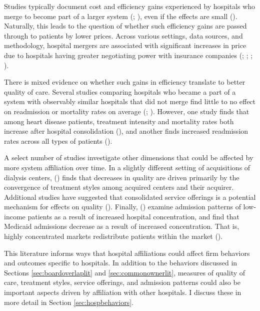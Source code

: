 \documentclass[12pt]{article}
\begin{document}
    Studies typically document cost and efficiency gains experienced by hospitals who merge to become part of a larger system (\cite{schmitt2017hospital}; \cite{andreyeva2024corporatization}), even if the effects are small (\cite{craig2021mergers}). Naturally, this leads to the question of whether such efficiency gains are passed through to patients by lower prices. Across various settings, data sources, and methodology, hospital mergers are associated with significant increases in price due to hospitals having greater negotiating power with insurance companies (\cite{gaynor2012impact}; \cite{boozary2019association}; \cite{cooper2019price}; \cite{andreyeva2024corporatization}). 
    
    There is mixed evidence on whether such gains in efficiency translate to better quality of care.  Several studies comparing hospitals who became a part of a system with observably similar hospitals that did not merge find little to no effect on readmission or mortality rates on average (\cite{haas2011mergers}; \cite{beaulieu2020changes}). However, one study finds that among heart disease patients, treatment intensity and mortality rates both increase after hospital consolidation (\cite{hayford2012impact}), and another finds increased readmission rates across all types of patients (\cite{andreyeva2024corporatization}). 

    A select number of studies investigate other dimensions that could be affected by more system affiliation over time. In a slightly different setting of acquisitions of dialysis centers, \citeauthor{eliason2020acquisitions} (\citeyear{eliason2020acquisitions}) finds that decreases in quality are driven primarily by the convergence of treatment styles among acquired centers and their acquirer. Additional studies have suggested that consolidated service offerings is a potential mechanism for effects on quality (\cite{mariani2022impact}). Finally, \citeauthor{desai2023hospital} (\citeyear{desai2023hospital}) examine admission patterns of low-income patients as a result of increased hospital concentration, and find that Medicaid admissions decrease as a result of increased concentration. That is, highly concentrated markets redistribute patients within the market (\cite{desai2023hospital}). 

    This literature informs ways that hospital affiliations could affect firm behaviors and outcomes specific to hospitals. In addition to the behaviors discussed in Sections \ref{sec:boardoverlaplit} and \ref{sec:commonownerlit}, measures of quality of care, treatment styles, service offerings, and admission patterns could also be important aspects driven by affiliation with other hospitals. I discuss these in more detail in Section \ref{sec:hospbehaviors}. 
\end{document}
